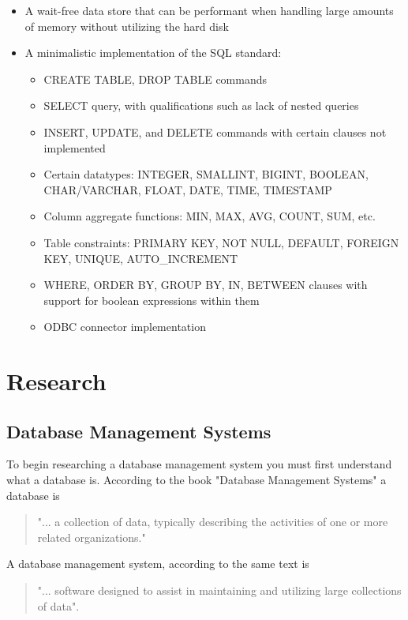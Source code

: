\documentclass[letterpaper, 12pt]{article}
\begin{document}
\begin{itemize}
 \item A wait-free data store that can be performant when handling large amounts
 of memory without utilizing the hard disk
 \item A minimalistic implementation of the SQL standard:
 \begin{itemize}
  \item CREATE TABLE, DROP TABLE commands
  \item SELECT query, with qualifications such as lack of nested queries
  \item INSERT, UPDATE, and DELETE commands with certain clauses not implemented
  \item Certain datatypes: INTEGER, SMALLINT, BIGINT, BOOLEAN, CHAR/VARCHAR, FLOAT, DATE, TIME, TIMESTAMP
  \item Column aggregate functions: MIN, MAX, AVG, COUNT, SUM, etc.
  \item Table constraints: PRIMARY KEY, NOT NULL, DEFAULT, FOREIGN KEY, UNIQUE, AUTO_INCREMENT
  \item WHERE, ORDER BY, GROUP BY, IN, BETWEEN clauses with support for boolean expressions within them
  \item ODBC connector implementation
 \end{itemize}
\end{itemize}

\newpage

\section{Research}

\subsection{Database Management Systems}
To begin researching a database management system you must first understand what a 
database is. According to the book "Database Management Systems" a database is

\begin{quote}
"... a collection of data, typically describing the activities of one or more related
organizations."\cite{ramakrishnan2000database}
\end{quote}

A database management system, according to the same text is

\begin{quote}
"... software designed to assist in maintaining and utilizing large collections of data".
\cite{ramakrishnan2000database}
\end{quote}
\end{document}
